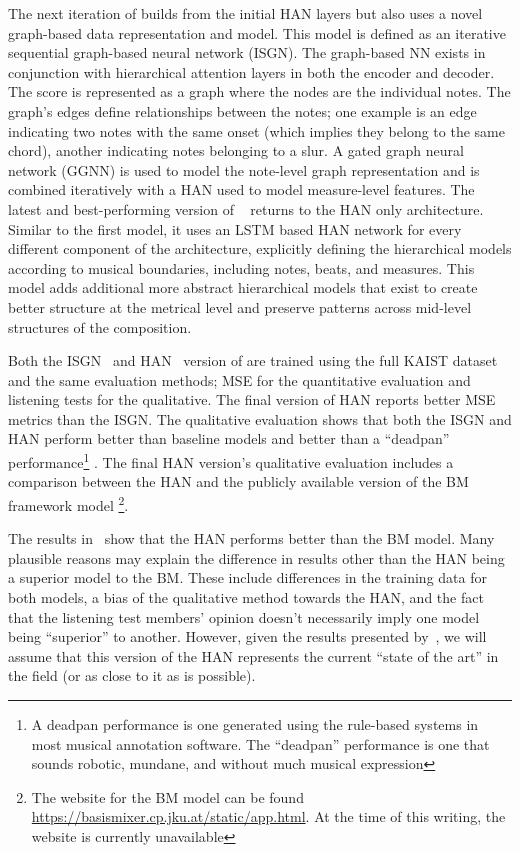 The next iteration of \vnet{} builds from the initial HAN layers but also uses a novel graph-based data representation and model. This model is defined as an iterative sequential graph-based neural network (ISGN). The graph-based NN exists in conjunction with hierarchical attention layers in both the encoder and decoder. The score is represented as a graph where the nodes are the individual notes. The graph's edges define relationships between the notes; one example is an edge indicating two notes with the same onset (which implies they belong to the same chord), another indicating notes belonging to a slur. A gated graph neural network (GGNN) is used to model the note-level graph representation and is combined iteratively with a HAN used to model measure-level features. The latest and best-performing version of \vnet{}~\cite{jeong2019virtuosonet} returns to the HAN only architecture. Similar to the first \vnet{} model, it uses an LSTM based HAN network for every different component of the architecture, explicitly defining the hierarchical models according to musical boundaries, including notes, beats, and measures. This model adds additional more abstract hierarchical models that exist to create better structure at the metrical level and preserve patterns across mid-level structures of the composition.

Both the ISGN~\cite{jeong2019graph} and HAN~\cite{jeong2019virtuosonet} version of \vnet{} are trained using the full KAIST dataset and the same evaluation methods; MSE for the quantitative evaluation and listening tests for the qualitative. The final version of HAN reports better MSE metrics than the ISGN. The qualitative evaluation shows that both the ISGN and HAN perform better than baseline models and better than a ``deadpan'' performance\footnote{A deadpan performance is one generated using the rule-based systems in most musical annotation software. The ``deadpan'' performance is one that sounds robotic, mundane, and without much musical expression} . The final HAN version's qualitative evaluation includes a comparison between the HAN and the publicly available version of the BM framework model \footnote{The website for the BM model can be found \href{here}{https://basismixer.cp.jku.at/static/app.html}. At the time of this writing, the website is currently unavailable}. 

The results in~\cite{jeong2019virtuosonet} show that the HAN performs better than the BM model. Many plausible reasons may explain the difference in results other than the HAN being a superior model to the BM. These include differences in the training data for both models, a bias of the qualitative method towards the HAN, and the fact that the listening test members' opinion doesn't necessarily imply one model being ``superior'' to another. However, given the results presented by~\citet{jeong2019virtuosonet}, we will assume that this version of the HAN represents the current ``state of the art'' in the field (or as close to it as is possible). 

